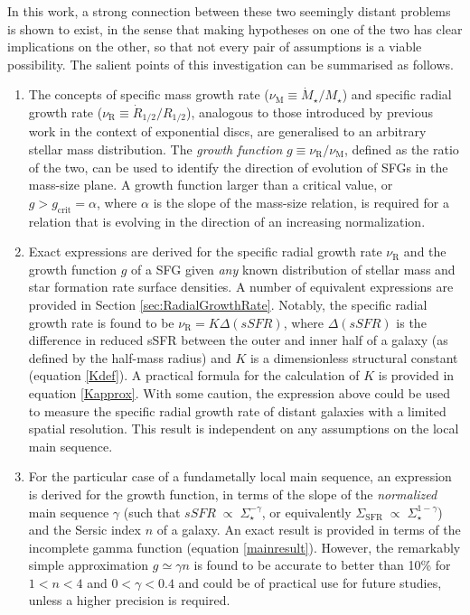 \documentclass[fleqn,usenatbib]{mnras}
\begin{document}
In this work, a strong connection between these two seemingly distant problems is shown to exist, in the sense that making hypotheses on one of the two has clear implications on the other, so that not every pair of assumptions is a viable possibility. The salient points of this investigation can be summarised as follows.
\begin{enumerate}
\item{The concepts of specific mass growth rate ($\nu_\textrm{M} \equiv \dot{M}_\star/M_\star$) and specific radial growth rate ($\nu_\textrm{R} \equiv \dot{R}_{1/2}/R_{1/2}$), analogous to those introduced by previous work in the context of exponential discs, are generalised to an arbitrary stellar mass distribution. The \emph{growth function} $g \equiv \nu_\textrm{R}/\nu_\textrm{M}$, defined as the ratio of the two, can be used to identify the direction of evolution of SFGs in the mass-size plane. A growth function larger than a critical value, or $g > g_\textrm{crit} = \alpha$, where $\alpha$ is the slope of the mass-size relation, is required for a relation that is evolving in the direction of an increasing normalization.}
\item{Exact expressions are derived for the specific radial growth rate $\nu_\textrm{R}$ and the growth function $g$ of a SFG given \emph{any} known distribution of stellar mass and star formation rate surface densities. A number of equivalent expressions are provided in Section \ref{sec:RadialGrowthRate}. Notably, the specific radial growth rate is found to be $\nu_\textrm{R} = K \Delta(sSFR)$, where $\Delta(sSFR)$ is the difference in reduced sSFR between the outer and inner half of a galaxy (as defined by the half-mass radius) and $K$ is a dimensionless structural constant (equation \ref{Kdef}). A practical formula for the calculation of $K$ is provided in equation \eqref{Kapprox}. With some caution, the expression above could be used to measure the specific radial growth rate of distant galaxies with a limited spatial resolution. This result is independent on any assumptions on the local main sequence.}
\item{For the particular case of a fundametally local main sequence, an expression is derived for the growth function, in terms of the slope of the \emph{normalized} main sequence $\gamma$ (such that $sSFR \; \propto \; \Sigma_\star^{-\gamma}$, or equivalently $\Sigma_\textrm{SFR} \; \propto \; \Sigma_\star^{1-\gamma}$) and the Sersic index $n$ of a galaxy. An exact result is provided in terms of the incomplete gamma function (equation \ref{mainresult}). However, the remarkably simple approximation $g \simeq \gamma n$ is found to be accurate to better than 10\% for $1<n<4$ and $0 < \gamma < 0.4$ and could be of practical use for future studies, unless a higher precision is required.}

\end{enumerate}
\end{document}
